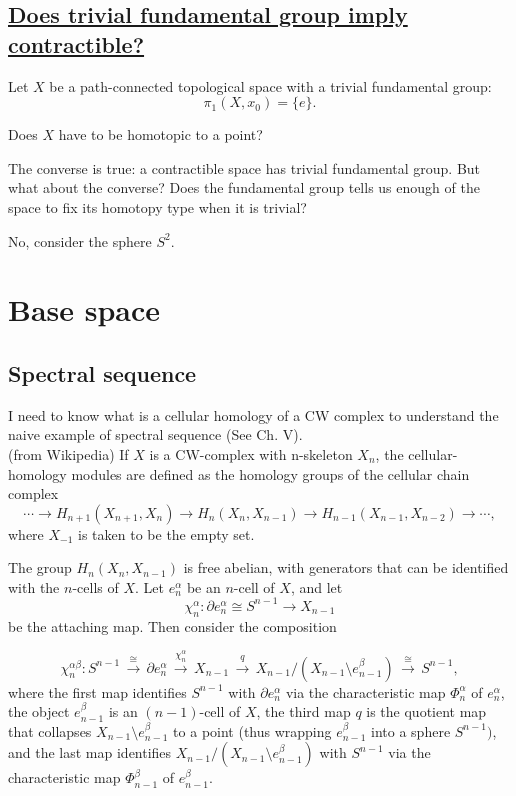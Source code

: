 \subsection{\href{https://math.stackexchange.com/questions/1401483/does-trivial-fundamental-group-imply-contractible}{Does trivial fundamental group imply contractible?}}

Let $X$ be a path-connected topological space with a trivial fundamental group:
$$\pi_1(X,x_0)=\{e\}.$$

Does $X$ have to be homotopic to a point?

The converse is true: a contractible space has trivial fundamental group. But what about the converse? Does the fundamental group tells us enough of the space to fix its homotopy type when it is trivial?

No, consider the sphere $S^2$.



\section{Base space}

 \subsection{Spectral sequence}
 I need to know what is a cellular homology of a CW complex to understand the naive example of spectral sequence (See \cite{hatcher} Ch. V).\\ 
 (from Wikipedia) If $X$ is a CW-complex with n-skeleton  $X_{n}$, the cellular-homology modules are defined as the homology groups of the cellular chain complex
\[\cdots \to {H_{n+1}}(X_{n+1},X_{n})\to {H_{n}}(X_{n},X_{n-1})\to {H_{n-1}}(X_{n-1},X_{n-2})\to \cdots ,\]
where  $X_{-1}$ is taken to be the empty set.

The group ${H_{n}}(X_{n},X_{n-1})$ is free abelian, with generators that can be identified with the  $n$-cells of  $X$. Let  $e_{n}^{\alpha }$ be an $n$-cell of $X$, and let  \[ \chi _{n}^{\alpha }:\partial e_{n}^{\alpha }\cong S^{n-1}\to X_{n-1}\] be the attaching map. Then consider the composition

 \[\chi _{n}^{\alpha \beta }:S^{n-1}\,{\stackrel {\cong }{\longrightarrow }}\,\partial e_{n}^{\alpha }\,{\stackrel {\chi _{n}^{\alpha }}{\longrightarrow }}\,X_{n-1}\,{\stackrel {q}{\longrightarrow }}\,X_{n-1}/\left(X_{n-1}\setminus e_{n-1}^{\beta }\right)\,{\stackrel {\cong }{\longrightarrow }}\, S^{n-1},\]
where the first map identifies $S^{n-1}$ with $\partial e_{n}^{\alpha }$ via the characteristic map  $\Phi _{n}^{\alpha }$ of $e_{n}^{\alpha }$, the object $e_{n-1}^{\beta }$ is an  $(n-1)$-cell of $X$, the third map  $q$ is the quotient map that collapses $X_{n-1}\setminus e_{n-1}^{\beta }$ to a point (thus wrapping  $e_{n-1}^{\beta }$ into a sphere  $S^{n-1})$, and the last map identifies $X_{n-1}/\left(X_{n-1}\setminus e_{n-1}^{\beta }\right)$ with  $S^{n-1}$ via the characteristic map  $\Phi _{n-1}^{\beta }$ of  $e_{n-1}^{\beta }$.


